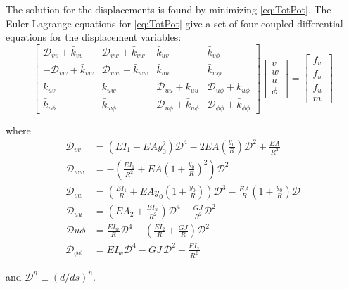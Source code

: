\documentclass[../thesis.tex]{subfiles}
\newcommand{\D}{\mathcal{D}}
\begin{document}
The solution for the displacements is found by minimizing \eqref{eq:TotPot}. The Euler-Lagrange equations for \eqref{eq:TotPot} give a set of four coupled differential equations for the displacement variables:
\begin{equation}
\label{eq:EulerLagrange}
\begin{bmatrix}
 \D_{vv} + \bar{k}_{vv} & \D_{vw} + \bar{k}_{vw} & \bar{k}_{uv} & \bar{k}_{v\phi}\\
-\D_{vw} + \bar{k}_{vw} & \D_{ww} + \bar{k}_{ww} & \bar{k}_{uw} & \bar{k}_{w\phi}\\
\bar{k}_{uv}    & \bar{k}_{uw}    & \D_{uu} + \bar{k}_{uu} & \D_{u\phi} + \bar{k}_{u\phi}\\
\bar{k}_{v\phi} & \bar{k}_{w\phi} & \D_{u\phi} + \bar{k}_{u\phi} & \D_{\phi\phi} + \bar{k}_{\phi\phi}
\end{bmatrix}
\begin{bmatrix}
v\\w\\u\\\phi
\end{bmatrix}=
\begin{bmatrix}
f_v\\f_w\\f_u\\m
\end{bmatrix}
\end{equation}

where
\begin{align*}
\D_{vv} &= (EI_1 + EAy_0^2)\D^4 - 2EA\left(\frac{y_0}{R}\right)\D^2 + \frac{EA}{R^2}\\
\D_{ww} &= -\left(\frac{EI_1}{R^2} + EA\left(1+\frac{y_0}{R}\right)^2\right)\D^2\\
\D_{vw} &= \left(\frac{EI_1}{R} + EAy_0\left(1+\frac{y_0}{R}\right)\right)\D^3 - \frac{EA}{R}\left(1+\frac{y_0}{R}\right)\D\\
\D_{uu} &= \left(EA_2 + \frac{EI_w}{R^2}\right)\D^4 - \frac{GJ}{R^2}\D^2\\
\D {u\phi} &= \frac{EI_w}{R}\D^4 - \left(\frac{EI_2}{R} + \frac{GJ}{R}\right)\D^2\\
\D_{\phi\phi} &= EI_w\D^4 - GJ\,\D^2 + \frac{EI_2}{R^2}
\end{align*}

and $\D^n \equiv (d/ds)^n$.
\end{document}
